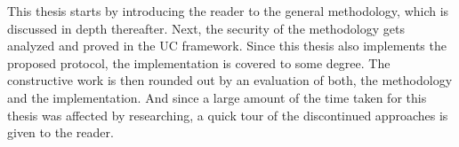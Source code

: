 %
%

This thesis starts by introducing the reader to the general methodology, which
is discussed in depth thereafter. Next, the security of the methodology gets
analyzed and proved in the UC framework. Since this thesis also implements the
proposed protocol, the implementation is covered to some degree. The
constructive work is then rounded out by an evaluation of both, the methodology
and the implementation. And since a large amount of the time taken for this
thesis was affected by researching, a quick tour of the discontinued approaches
is given to the reader.

